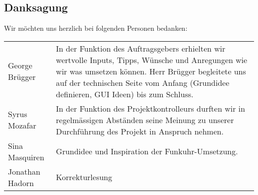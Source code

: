\subsection{Danksagung}
Wir möchten uns herzlich bei folgenden Personen bedanken:\\
\vspace{0.5cm}

\begin{tabular}{p{3cm} p{10cm}}
George Brügger & In der Funktion des Auftragsgebers erhielten wir wertvolle Inputs, Tipps, Wünsche und Anregungen wie wir was umsetzen können. Herr Brügger begleitete uns auf der technischen Seite vom Anfang (Grundidee definieren, GUI Ideen) bis zum Schluss.\\
Syrus Mozafar & In der Funktion des Projektkontrolleurs durften wir in regelmässigen Abständen seine Meinung zu unserer Durchführung des Projekt in Anspruch nehmen.\\
Sina Masquiren & Grundidee und Inspiration der Funkuhr-Umsetzung.\\
Jonathan Hadorn & Korrekturlesung\\
\end{tabular}
